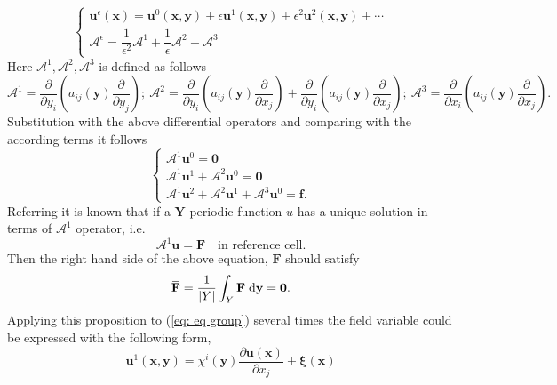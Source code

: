 \documentclass[10pt,a4paper]{scrreprt}
\newcommand{\myd}{\;\mathrm{d}}
\newcommand{\overbar}[1]{\mkern 1.5mu\overline{\mkern-1.5mu#1\mkern-1.5mu}\mkern 1.5mu}
\begin{document}
\begin{equation}
\left\{
\begin{array}{l}
\mathbf{u}^{\epsilon}(\mathbf{x}) = \mathbf{u}^{0}(\mathbf{x},\mathbf{y}) + \epsilon \mathbf{u}^{1}(\mathbf{x},\mathbf{y}) + \epsilon^{2} \mathbf{u}^{2}(\mathbf{x},\mathbf{y}) + \cdots \\
\mathcal{A}^{\epsilon} = \dfrac{1}{\epsilon^{2}} \mathcal{A}^{1} + \dfrac{1}{\epsilon} \mathcal{A}^{2} + \mathcal{A}^{3}
\end{array}
\right.
\end{equation}
Here $\mathcal{A}^{1}, \mathcal{A}^{2}, \mathcal{A}^{3}$ is defined as follows
\[
\mathcal{A}^{1} = \dfrac{\partial}{\partial y_{i}} \left( a_{ij}(\mathbf{y}) \dfrac{\partial}{\partial y_{j}} \right); \
\mathcal{A}^{2} = \dfrac{\partial}{\partial y_{i}} \left( a_{ij}(\mathbf{y}) \dfrac{\partial}{\partial x_{j}} \right) + \dfrac{\partial}{\partial y_{i}} \left( a_{ij}(\mathbf{y}) \dfrac{\partial}{\partial x_{j}} \right); \
\mathcal{A}^{3} = \dfrac{\partial}{\partial x_{i}} \left( a_{ij}(\mathbf{y}) \dfrac{\partial}{\partial x_{j}} \right).
\]
Substitution with the above differential operators and comparing with the according terms it follows
\begin{equation}
\label{eq: eq group}
\left\{
\begin{array}{l}
\mathcal{A}^{1} \mathbf{u}^{0} = \mathbf{0} \\
\mathcal{A}^{1} \mathbf{u}^{1} + \mathcal{A}^{2} \mathbf{u}^{0} = \mathbf{0} \\
\mathcal{A}^{1} \mathbf{u}^{2} + \mathcal{A}^{2} \mathbf{u}^{1} + \mathcal{A}^{3} \mathbf{u}^{0} = \mathbf{f}.
\end{array}
\right.
\end{equation}
Referring \citep{cioranescu_introduction_2000} it is known that if a $\mathbf{Y}$-periodic function $u$ has a unique solution in terms of $\mathcal{A}^{1}$ operator, i.e. 
\begin{equation}
\mathcal{A}^{1} \mathbf{u} = \mathbf{F} \quad \text{in reference cell}.
\end{equation}
Then the right hand side of the above equation, $\mathbf{F}$ should satisfy 
\begin{equation}
\overbar{\mathbf{F}} = \dfrac{1}{|Y|}\int_{Y} \mathbf{F} \myd{\mathbf{y}} = \mathbf{0}.
\end{equation}
Applying this proposition to (\ref{eq: eq group}) several times the field variable could be expressed with the following form,
\begin{equation}
\mathbf{u}^{1}(\mathbf{x}, \mathbf{y}) = \chi^{i}(\mathbf{y}) \dfrac{\partial \mathbf{u}(\mathbf{x})}{\partial x_{j}} + \mathbf{\xi} (\mathbf{x})
\end{equation}
\end{document}
